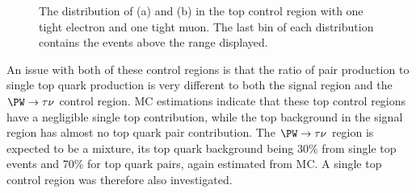 \begin{figure}
  \caption{The distribution of \jetmetdphi (a) and \Mjj (b) in the top control region with one tight electron and one tight muon. The last bin of each distribution contains the events above the range displayed.}
  \label{fig:parkedtopjetmetdphi}
\end{figure}


An issue with both of these control regions is that the ratio of pair production to single top quark production is very different to both the signal region and the $\PW\rightarrow\tau\nu$ control region. \ac{MC} estimations indicate that these top control regions have a negligible single top contribution, while the top background in the signal region has almost no top quark pair contribution. The $\PW\rightarrow\tau\nu$ region is expected to be a mixture, its top quark background being 30\% from single top events and 70\% for top quark pairs, again estimated from \ac{MC}. A single top control region was therefore also investigated.

